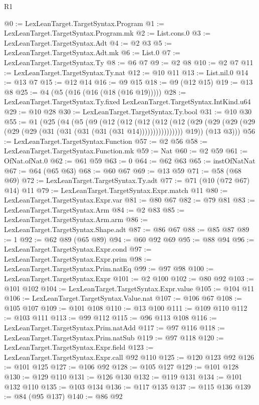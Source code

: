 \begin{lexlean}{R1}
\begin{coremodule}
@0 := LexLeanTarget.TargetSyntax.Program
@1 := LexLeanTarget.TargetSyntax.Program.mk
@2 := List.cons.{0}
@3 := LexLeanTarget.TargetSyntax.Adt
@4 := @2 @3
@5 := LexLeanTarget.TargetSyntax.Adt.mk
@6 := List.{0}
@7 := LexLeanTarget.TargetSyntax.Ty
@8 := @6 @7
@9 := @2 @8
@10 := @2 @7
@11 := LexLeanTarget.TargetSyntax.Ty.nat
@12 := @10 @11
@13 := List.nil.{0}
@14 := @13 @7
@15 := @12 @14
@16 := @9 @15
@18 := @9 (@12 @15)
@19 := @13 @8
@25 := @4 (@5 (@16 (@16 (@18 (@16 @19)))))
@28 := LexLeanTarget.TargetSyntax.Ty.fixed LexLeanTarget.TargetSyntax.IntKind.u64
@29 := @10 @28
@30 := LexLeanTarget.TargetSyntax.Ty.bool
@31 := @10 @30
@55 := @1
    (@25
      (@4
        (@5
          (@9
            (@12
              (@12
                (@12
                  (@12
                    (@12 (@29 (@29 (@29 (@29 (@29 (@29 (@31 (@31 (@31 (@31 (@31 @14))))))))))))))))
            @19))
        (@13 @3)))
@56 := LexLeanTarget.TargetSyntax.Function
@57 := @2 @56
@58 := LexLeanTarget.TargetSyntax.Function.mk
@59 := Nat
@60 := @2 @59
@61 := OfNat.ofNat.{0}
@62 := @61 @59
@63 := 0
@64 := @62 @63
@65 := instOfNatNat
@67 := @64 (@65 @63)
@68 := @60 @67
@69 := @13 @59
@71 := @58 (@68 @69)
@72 := LexLeanTarget.TargetSyntax.Ty.adt
@77 := @71 (@10 (@72 @67) @14) @11
@79 := LexLeanTarget.TargetSyntax.Expr.match @11
@80 := LexLeanTarget.TargetSyntax.Expr.var
@81 := @80 @67
@82 := @79 @81
@83 := LexLeanTarget.TargetSyntax.Arm
@84 := @2 @83
@85 := LexLeanTarget.TargetSyntax.Arm.arm
@86 := LexLeanTarget.TargetSyntax.Shape.adt
@87 := @86 @67
@88 := @85 @87
@89 := 1
@92 := @62 @89 (@65 @89)
@94 := @60 @92 @69
@95 := @88 @94
@96 := LexLeanTarget.TargetSyntax.Expr.cond
@97 := LexLeanTarget.TargetSyntax.Expr.prim
@98 := LexLeanTarget.TargetSyntax.Prim.natEq
@99 := @97 @98
@100 := LexLeanTarget.TargetSyntax.Expr
@101 := @2 @100
@102 := @80 @92
@103 := @101 @102
@104 := LexLeanTarget.TargetSyntax.Expr.value
@105 := @104 @11
@106 := LexLeanTarget.TargetSyntax.Value.nat
@107 := @106 @67
@108 := @105 @107
@109 := @101 @108
@110 := @13 @100
@111 := @109 @110
@112 := @103 @111
@113 := @99 @112
@115 := @96 @113 @108
@116 := LexLeanTarget.TargetSyntax.Prim.natAdd
@117 := @97 @116
@118 := LexLeanTarget.TargetSyntax.Prim.natSub
@119 := @97 @118
@120 := LexLeanTarget.TargetSyntax.Expr.field
@123 := LexLeanTarget.TargetSyntax.Expr.call @92 @110
@125 := @120 @123 @92
@126 := @101 @125
@127 := @106 @92
@128 := @105 @127
@129 := @101 @128
@130 := @129 @110
@131 := @126 @130
@132 := @119 @131
@134 := @101 @132 @110
@135 := @103 @134
@136 := @117 @135
@137 := @115 @136
@139 := @84 (@95 @137)
@140 := @86 @92

\end{coremodule}
\end{lexlean}
